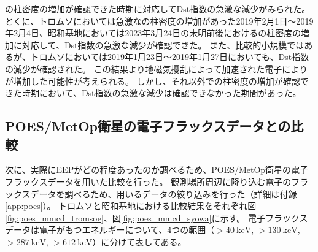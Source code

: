 の柱密度の増加が確認できた時期に対応してDst指数の急激な減少がみられた。
とくに、トロムソにおいては急激なの柱密度の増加があった2019年2月1日〜2019年2月4日、昭和基地においては2023年3月24日の未明前後におけるの柱密度の増加に対応して、Dst指数の急激な減少が確認できた。
また、比較的小規模ではあるが、トロムソにおいては2019年1月23日〜2019年1月27日においても、Dst指数の減少が確認された。
この結果より地磁気擾乱によって加速された電子によりが増加した可能性が考えられる。
しかし、それ以外での柱密度の増加が確認できた時期において、Dst指数の急激な減少は確認できなかった期間があった。


\subsection{POES/MetOp衛星の電子フラックスデータとの比較}
\label{ssec:comparison_poes}
次に、実際にEEPがどの程度あったのか調べるため、POES/MetOp衛星の電子フラックスデータを用いた比較を行った。
観測場所周辺に降り込む電子のフラックスデータを調べるため、用いるデータの絞り込みを行った（詳細は付録\ref{app:poes}）。
トロムソと昭和基地における比較結果をそれぞれ図\ref{fig:poes_mmcd_tromsoe}、図\ref{fig:poes_mmcd_syowa}に示す。
電子フラックスデータは電子がもつエネルギーについて、4つの範囲（$>40\ \mathrm{keV}$, $>130\ \mathrm{keV}$, $>287\ \mathrm{keV}$, $>612\ \mathrm{keV}$）に分けて表してある。
